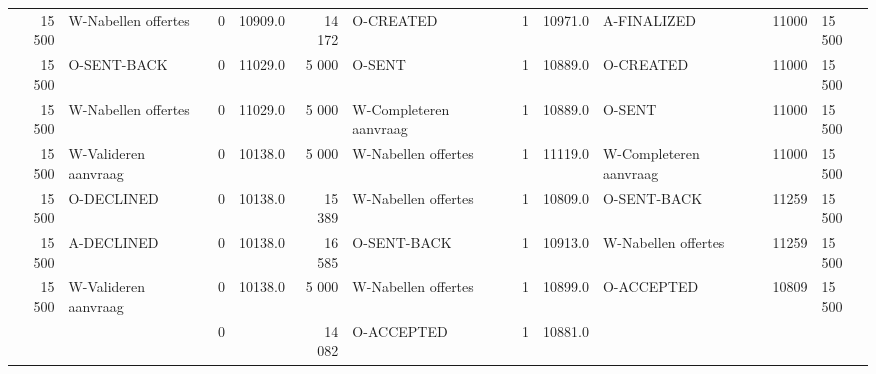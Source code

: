 \begin{tabular}{rlrlrlrllll}
15 500 & W-Nabellen offertes & 0 & 10909.0 & 14 172 & O-CREATED & 1 & 10971.0 & A-FINALIZED & 11000 & 15 500 \\
15 500 & O-SENT-BACK & 0 & 11029.0 & 5 000 & O-SENT & 1 & 10889.0 & O-CREATED & 11000 & 15 500 \\
15 500 & W-Nabellen offertes & 0 & 11029.0 & 5 000 & W-Completeren aanvraag & 1 & 10889.0 & O-SENT & 11000 & 15 500 \\
15 500 & W-Valideren aanvraag & 0 & 10138.0 & 5 000 & W-Nabellen offertes & 1 & 11119.0 & W-Completeren aanvraag & 11000 & 15 500 \\
15 500 & O-DECLINED & 0 & 10138.0 & 15 389 & W-Nabellen offertes & 1 & 10809.0 & O-SENT-BACK & 11259 & 15 500 \\
15 500 & A-DECLINED & 0 & 10138.0 & 16 585 & O-SENT-BACK & 1 & 10913.0 & W-Nabellen offertes & 11259 & 15 500 \\
15 500 & W-Valideren aanvraag & 0 & 10138.0 & 5 000 & W-Nabellen offertes & 1 & 10899.0 & O-ACCEPTED & 10809 & 15 500 \\
 &  & 0 &  & 14 082 & O-ACCEPTED & 1 & 10881.0 &  &  &  \\
\bottomrule
\end{tabular}
